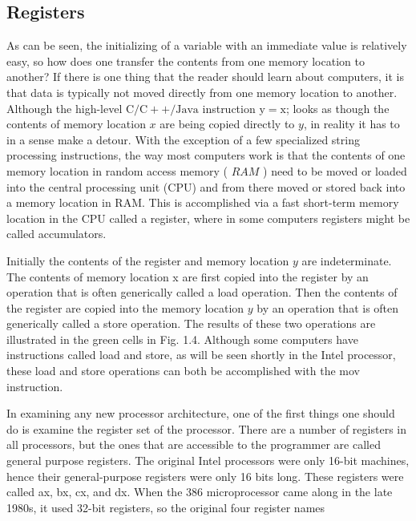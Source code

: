 \documentclass[10pt]{book}
\begin{document}
\subsection{Registers}
As can be seen, the initializing of a variable with an immediate value is relatively easy, so how does one transfer the contents from one memory location to another? If there is one thing that the reader should learn about computers, it is that data is typically not moved directly from one memory location to another. Although the high-level $\mathrm{C} / \mathrm{C}++/ \mathrm{Java}$ instruction $\mathrm{y}=\mathrm{x}$; looks as though the contents of memory location $x$ are being copied directly to $y$, in reality it has to in a sense make a detour. With the exception of a few specialized string processing instructions, the way most computers work is that the contents of one memory location in random access memory ( $R A M$ ) need to be moved or loaded into the central processing unit (CPU) and from there moved or stored back into a memory location in RAM. This is accomplished via a fast short-term memory location in the CPU called a register, where in some computers registers might be called accumulators.

Initially the contents of the register and memory location $y$ are indeterminate. The contents of memory location x are first copied into the register by an operation that is often generically called a load operation. Then the contents of the register are copied into the memory location $y$ by an operation that is often generically called a store operation. The results of these two operations are illustrated in the green cells in Fig. 1.4. Although some computers have instructions called load and store, as will be seen shortly in the Intel processor, these load and store operations can both be accomplished with the mov instruction.

In examining any new processor architecture, one of the first things one should do is examine the register set of the processor. There are a number of registers in all processors, but the ones that are accessible to the programmer are called general purpose registers. The original Intel processors were only 16-bit machines, hence their general-purpose registers were only 16 bits long. These registers were called ax, bx, cx, and dx. When the 386 microprocessor came along in the late 1980s, it used 32-bit registers, so the original four register names

\end{document}
